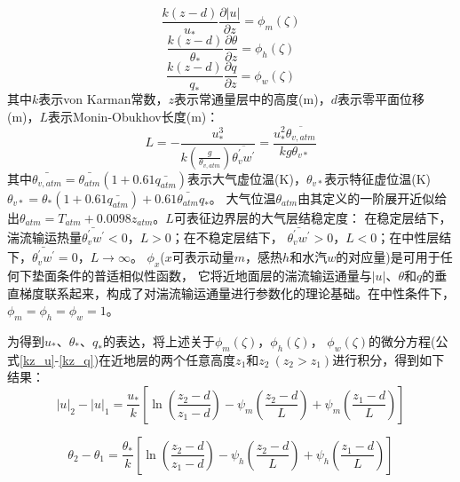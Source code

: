 \begin{equation}\label{kz_u}
\frac{k(z-d)}{u_{*}} \frac{\partial|u|}{\partial z}=\phi_{m}(\zeta)
\end{equation}
\begin{equation}\label{kz_theta}
\frac{k(z-d)}{\theta_{*}} \frac{\partial \theta}{\partial z}=\phi_{h}(\zeta)
\end{equation}
\begin{equation}\label{kz_q}
\frac{k(z-d)}{q_{*}} \frac{\partial q}{\partial z}=\phi_{w}(\zeta)
\end{equation}
其中$k$表示von Karman常数，$z$表示常通量层中的高度(m)，$d$表示零平面位移(m)，$L$表示Monin-Obukhov长度(m)：
\begin{equation}
L=-\frac{u_{*}^{3}}{k\left(\frac{g}{\theta_{v, atm}}\right) \overline{\theta_{v}^{\prime} w^{\prime}}}=\frac{u_{*}^{2} \overline{\theta_{v, atm}}}{k g \theta_{v *}}
\end{equation}
其中$\bar{\theta_{v,atm}}=\bar{\theta_{atm}}(1+0.61\bar{q_{atm}})$表示大气虚位温(K)，$\theta_{v\ast}$表示特征虚位温(K)
 $\theta_{v\ast}=\theta_\ast\left(1+0.61\bar{q_{atm}}\right)+0.61\bar{\theta_{atm}}q_\ast$。
 大气位温$\theta_{atm}$由其定义的一阶展开近似给出$\theta_{atm}=T_{atm}+0.0098z_{atm}$。$L$可表征边界层的大气层结稳定度：
 在稳定层结下，湍流输运热量$\bar{\theta_v^\prime w^\prime}<0$，$L>0$；在不稳定层结下，
 $\bar{\theta_v^\prime w^\prime}>0$，$L<0$；在中性层结下，$\bar{\theta_v^\prime w^\prime}=0$，$L\rightarrow\infty$。
 $\phi_x$($x$可表示动量$m$，感热$h$和水汽$w$的对应量)是可用于任何下垫面条件的普适相似性函数，
 它将近地面层的湍流输运通量与$\left|u\right|$、$\theta$和$q$的垂直梯度联系起来，构成了对湍流输运通量进行参数化的理论基础。在中性条件下，$\phi_m=\phi_h=\phi_w=1$。

为得到$u_\ast$、$\theta_\ast$、$q_\ast$的表达，将上述关于$\phi_m\left(\zeta\right)$，$\phi_h\left(\zeta\right)$，
$\phi_w(\zeta)$的微分方程(公式\ref{kz_u}-\ref{kz_q})在近地层的两个任意高度$z_1$和$z_2\ (z_2>z_1)$进行积分，得到如下结果：
\begin{equation}
|u|_{2}-|u|_{1}=\frac{u_{*}}{k}\left[\ln \left(\frac{z_{2}-d}{z_{1}-d}\right)-\psi_{m}\left(\frac{z_{2}-d}{L}\right)+\psi_{m}\left(\frac{z_{1}-d}{L}\right)\right]
\end{equation}

\begin{equation}
\theta_{2}-\theta_{1}=\frac{\theta_{*}}{k}\left[\ln \left(\frac{z_{2}-d}{z_{1}-d}\right)-\psi_{h}\left(\frac{z_{2}-d}{L}\right)+\psi_{h}\left(\frac{z_{1}-d}{L}\right)\right]
\end{equation}

